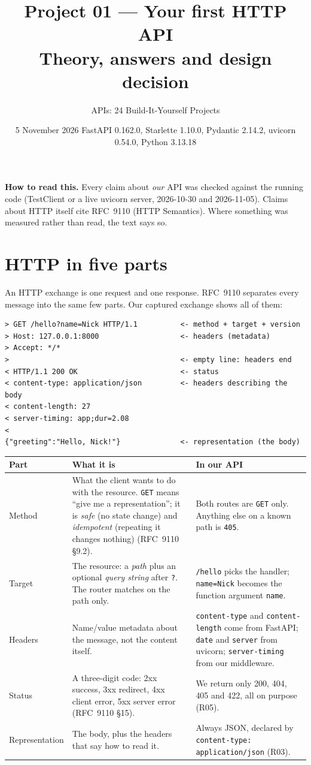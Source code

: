 \documentclass[11pt,a4paper]{article}
\title{\textbf{Project 01 --- Your first HTTP API}\\[0.3em]\large Theory, answers and design decision}
\author{APIs: 24 Build-It-Yourself Projects}
\date{5 November 2026 \quad\textbullet\quad FastAPI 0.162.0, Starlette 1.10.0, Pydantic 2.14.2, uvicorn 0.54.0, Python 3.13.18}
\newcommand{\code}[1]{\texttt{#1}}
\newcommand{\keypoint}[1]{%
  \par\smallskip\noindent\colorbox{boxbg}{\parbox{\dimexpr\linewidth-2\fboxsep}{\small #1}}\par\smallskip}
\begin{document}
\maketitle

\keypoint{\textbf{How to read this.} Every claim about \emph{our} API was checked
against the running code (TestClient or a live uvicorn server, 2026-10-30 and
2026-11-05). Claims about HTTP itself cite RFC~9110 (HTTP Semantics). Where
something was measured rather than read, the text says so.}

\setcounter{tocdepth}{1}
\tableofcontents

\section{HTTP in five parts}

An HTTP exchange is one request and one response. RFC~9110 separates every
message into the same few parts. Our captured exchange shows all of them:

\begin{Verbatim}[fontsize=\small, frame=single, framesep=2mm]
> GET /hello?name=Nick HTTP/1.1          <- method + target + version
> Host: 127.0.0.1:8000                   <- headers (metadata)
> Accept: */*
>                                        <- empty line: headers end
< HTTP/1.1 200 OK                        <- status
< content-type: application/json         <- headers describing the body
< content-length: 27
< server-timing: app;dur=2.08
<
{"greeting":"Hello, Nick!"}              <- representation (the body)
\end{Verbatim}

\begin{tabularx}{\linewidth}{@{}l L L@{}}
\toprule
\textbf{Part} & \textbf{What it is} & \textbf{In our API} \\
\midrule
Method & What the client wants to do with the resource. \code{GET} means
``give me a representation''; it is \emph{safe} (no state change) and
\emph{idempotent} (repeating it changes nothing) (RFC~9110 \S9.2). &
Both routes are \code{GET} only. Anything else on a known path is \code{405}. \\
Target & The resource: a \emph{path} plus an optional \emph{query string}
after \code{?}. The router matches on the path only. &
\code{/hello} picks the handler; \code{name=Nick} becomes the function
argument \code{name}. \\
Headers & Name/value metadata about the message, not the content itself. &
\code{content-type} and \code{content-length} come from FastAPI;
\code{date} and \code{server} from uvicorn; \code{server-timing} from our
middleware. \\
Status & A three-digit code: 2xx success, 3xx redirect, 4xx client error,
5xx server error (RFC~9110 \S15). &
We return only 200, 404, 405 and 422, all on purpose (R05). \\
Representation & The body, plus the headers that say how to read it. &
Always JSON, declared by \code{content-type: application/json} (R03). \\
\bottomrule
\end{tabularx}
\end{document}
